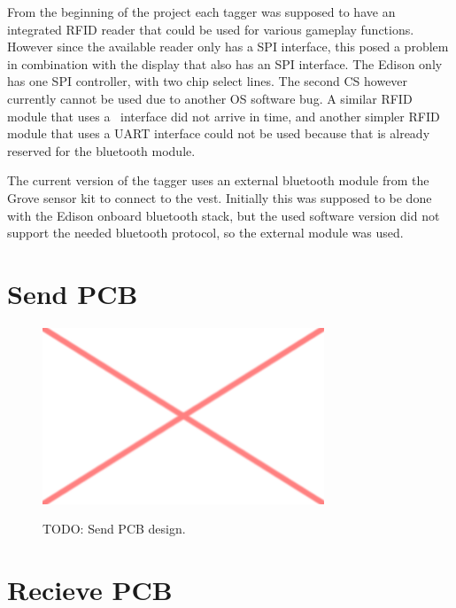 From the beginning of the project each tagger was supposed to have an integrated RFID reader that could be used for 
various gameplay functions. However since the available reader only has a SPI interface, this posed a problem in 
combination with the display that also has an SPI interface. The Edison only has one SPI controller, with two chip 
select lines. The second CS however currently cannot be used due to another OS software bug. A similar RFID module that 
uses a \isqc~interface did not arrive in time, and another simpler RFID module that uses a UART interface could not be 
used because that is already reserved for the bluetooth module.

The current version of the tagger uses an external bluetooth module from the Grove sensor kit  to connect to 
the vest. Initially this was supposed to be done with the Edison onboard bluetooth stack, but the used software version 
did not support the needed bluetooth protocol, so the external module was used.



\section{Send PCB}

\begin{figure}[h!]
\centering
\includegraphics[width=0.75\textwidth]{images/placeholder.png}\\
\caption[Send PCB]{TODO: Send PCB design.}
\label{fig:tag_ed_send}
\end{figure}

\section{Recieve PCB}

